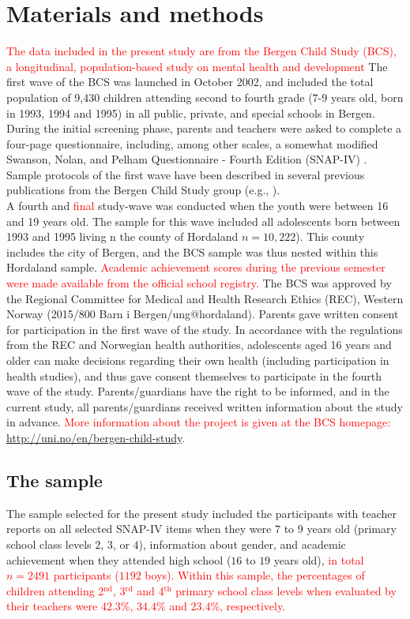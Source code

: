 \documentclass[10pt,letterpaper]{article}
\begin{document}
\section*{Materials and methods}
\textcolor{red}{The data included in the present study are from the Bergen Child Study (BCS), a longitudinal, population-based study on mental health and development}
The first wave of the BCS was launched in October 2002, and included the total population of 9,430 children attending second to fourth grade (7-9 years old, born in 1993, 1994 and 1995) in all public, private, and special schools in Bergen. 
During the initial screening phase, parents and teachers were asked to complete a four-page questionnaire, including, among other scales, a somewhat modified Swanson, Nolan, and Pelham Questionnaire - Fourth Edition (SNAP-IV) \cite{Swanson1992}.
Sample protocols of the first wave have been described in several previous publications from the Bergen Child Study group 
(e.g., \cite{Heiervang2007, Lundervold2011, Sivertsen2015}).\\

A fourth and \textcolor{red} {final} study-wave was conducted when the youth were between 16 and 19 years old. The sample for this wave included all adolescents born between 1993 and 1995 living n the county of Hordaland $n=10,222$). This county includes the city of Bergen, and the BCS sample was thus nested within this Hordaland sample. \textcolor{red} { Academic achievement scores  during the previous semester were made available from the official school registry.}  The BCS was approved by the Regional Committee for Medical and Health Research Ethics (REC), Western Norway (2015/800 Barn i Bergen/ung$@$hordaland). Parents gave written consent for participation in the first wave of the study. In accordance with the regulations from the REC and Norwegian health authorities, adolescents aged 16 years and older can make decisions regarding their own health (including participation in health studies), and thus gave consent themselves to participate in the fourth wave of the study. Parents/guardians have the right to be informed, and in the current study, all parents/guardians received written information about the study in advance.
\textcolor{red}{More information about the project is given at the BCS homepage: {\small \url{http://uni.no/en/bergen-child-study}}.}

\vspace{3mm}
\subsection*{The sample}
The sample selected for the present study included the participants with teacher reports on all selected SNAP-IV items when they were $7$ to $9$ years old (primary school class levels $2$, $3$, or $4$), information about gender, and academic achievement when they attended high school ($16$ to $19$ years old), \textcolor{red}{in total $n=2491$ participants ($1192$ boys).}
\textcolor{red}{Within this sample, the percentages of children attending 2$^{\text{nd}}$, 3$^{\text{rd}}$ and 4$^{\text{th}}$ primary school
 class levels when evaluated by their teachers were 
\textcolor{red}{42.3\%, 34.4\% and 23.4\%}, respectively.}
\end{document}
